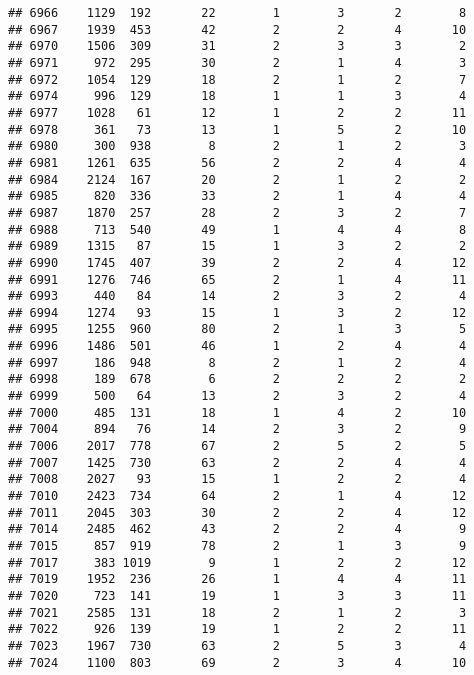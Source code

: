 \documentclass[]{article}
\begin{document}
\begin{verbatim}
## 6966    1129  192       22        1        3       2        8
## 6967    1939  453       42        2        2       4       10
## 6970    1506  309       31        2        3       3        2
## 6971     972  295       30        2        1       4        3
## 6972    1054  129       18        2        1       2        7
## 6974     996  129       18        1        1       3        4
## 6977    1028   61       12        1        2       2       11
## 6978     361   73       13        1        5       2       10
## 6980     300  938        8        2        1       2        3
## 6981    1261  635       56        2        2       4        4
## 6984    2124  167       20        2        1       2        2
## 6985     820  336       33        2        1       4        4
## 6987    1870  257       28        2        3       2        7
## 6988     713  540       49        1        4       4        8
## 6989    1315   87       15        1        3       2        2
## 6990    1745  407       39        2        2       4       12
## 6991    1276  746       65        2        1       4       11
## 6993     440   84       14        2        3       2        4
## 6994    1274   93       15        1        3       2       12
## 6995    1255  960       80        2        1       3        5
## 6996    1486  501       46        1        2       4        4
## 6997     186  948        8        2        1       2        4
## 6998     189  678        6        2        2       2        2
## 6999     500   64       13        2        3       2        4
## 7000     485  131       18        1        4       2       10
## 7004     894   76       14        2        3       2        9
## 7006    2017  778       67        2        5       2        5
## 7007    1425  730       63        2        2       4        4
## 7008    2027   93       15        1        2       2        4
## 7010    2423  734       64        2        1       4       12
## 7011    2045  303       30        2        2       4       12
## 7014    2485  462       43        2        2       4        9
## 7015     857  919       78        2        1       3        9
## 7017     383 1019        9        1        2       2       12
## 7019    1952  236       26        1        4       4       11
## 7020     723  141       19        1        3       3       11
## 7021    2585  131       18        2        1       2        3
## 7022     926  139       19        1        2       2       11
## 7023    1967  730       63        2        5       3        4
## 7024    1100  803       69        2        3       4       10

\end{verbatim}
\end{document}
